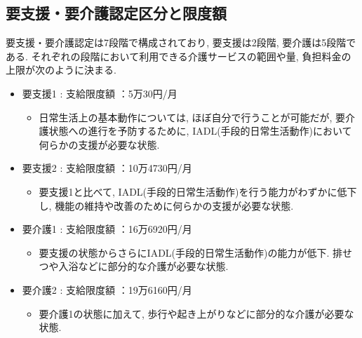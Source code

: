 \subsection{要支援・要介護認定区分と限度額}
要支援・要介護認定は7段階で構成されており,  要支援は2段階, 要介護は5段階である.
それぞれの段階において利用できる介護サービスの範囲や量, 負担料金の上限が次のように決まる.

\begin{itemize} \setlength{\itemsep}{-0.5mm} \setlength{\parskip}{-0.5mm}
	\item 要支援1  :  支給限度額 ：5万30円/月
	      \begin{itemize} \setlength{\itemsep}{-0.5mm} \setlength{\parskip}{-0.5mm}
		      \item 日常生活上の基本動作については, ほぼ自分で行うことが可能だが, 要介護状態への進行を予防するために, IADL(手段的日常生活動作)において何らかの支援が必要な状態.
	      \end{itemize}

	\item 要支援2  :  支給限度額 ：10万4730円/月

	      \begin{itemize} \setlength{\itemsep}{-0.5mm} \setlength{\parskip}{-0.5mm}
		      \item 要支援1と比べて, IADL(手段的日常生活動作)を行う能力がわずかに低下し, 機能の維持や改善のために何らかの支援が必要な状態.

	      \end{itemize}

	\item 要介護1 : 支給限度額 ：16万6920円/月


	      \begin{itemize} \setlength{\itemsep}{-0.5mm} \setlength{\parskip}{-0.5mm}
		      \item 要支援の状態からさらにIADL(手段的日常生活動作)の能力が低下. 排せつや入浴などに部分的な介護が必要な状態.

	      \end{itemize}

	\item 要介護2 : 支給限度額 ：19万6160円/月


	      \begin{itemize} \setlength{\itemsep}{-0.5mm} \setlength{\parskip}{-0.5mm}
		      \item 要介護1の状態に加えて, 歩行や起き上がりなどに部分的な介護が必要な状態.


\end{itemize}
\end{itemize}
